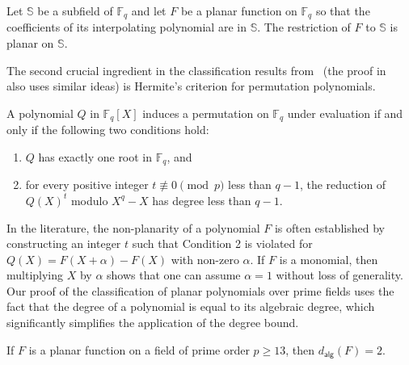 \documentclass[12pt]{article}
\newcommand{\F}{\mathbb{F}}
\newcommand{\adeg}[1]{d_{\mathsf{alg}}(#1)}
\begin{document}
\begin{lemma}
\label{lem:restriction}
    Let $\mathbb{S}$ be a subfield of $\F_q$ and let $F$ be a planar function on $\F_q$ so that the coefficients of its interpolating polynomial are in $\mathbb{S}$. The restriction of $F$ to $\mathbb{S}$ is planar on $\mathbb{S}$. 
\end{lemma}

The second crucial ingredient in the classification results from~\cite{DBLP:journals/ffa/BergmanCV22,coulter2006classification,DBLP:journals/ffa/CoulterL12} (the proof in~\cite{hiramine1989conjecture} also uses similar ideas) is Hermite's criterion for permutation polynomials.

\begin{lemma}
    \label{lem:Hermite} A polynomial $Q$ in $\F_q[X]$ induces a permutation on $\F_q$ under evaluation if and only if the following two conditions hold:
    \begin{enumerate}
        \item $Q$ has exactly one root in $\F_q$, and
        \item for every positive integer $t \not\equiv 0 \pmod{p}$ less than $q-1$, the reduction of $Q(X)^t$ modulo $X^q-X$ has degree less than $q-1$.
    \end{enumerate}
\end{lemma}
In the literature, the non-planarity of a polynomial $F$ is often established by constructing an integer $t$ such that Condition 2 is violated for $Q(X) = F(X+\alpha)-F(X)$ with non-zero $\alpha$.
If $F$ is a monomial, then multiplying $X$ by $\alpha$ shows that one can assume $\alpha = 1$ without loss of generality.
Our proof of the classification of planar polynomials over prime fields uses the fact that the degree of a polynomial is equal to its algebraic degree, which significantly simplifies the application of the degree bound.
\begin{corollary} \label{cor:planarPrimeField}
If $F$ is a planar function on a field of prime order $p \geq 13$, then $\adeg{F} = 2$.
\end{corollary}
\end{document}
